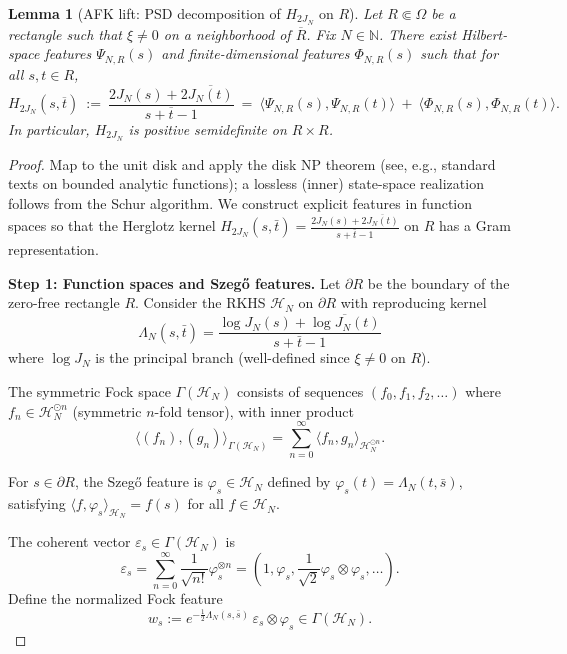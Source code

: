\documentclass[11pt]{article}
\newtheorem{lemma}[theorem]{Lemma}
\theoremstyle{definition}
\theoremstyle{remark}
\begin{document}
\begin{lemma}[AFK lift: PSD decomposition of \(H_{2J_N}\) on \(R\)]\label{lem:AFK}
Let \(R\Subset\Omega\) be a rectangle such that \(\xi\neq 0\) on a neighborhood of \(\overline R\). Fix \(N\in\mathbb N\). There exist Hilbert-space features \(\Psi_{N,R}(s)\) and finite-dimensional features \(\Phi_{N,R}(s)\) such that for all \(s,t\in R\),
\[
 H_{2J_N}(s,\overline t)\ :=\ \frac{2J_N(s)+2\overline{J_N(t)}}{s+\overline t-1}\ =\ \big\langle\Psi_{N,R}(s),\Psi_{N,R}(t)\big\rangle\ +\ \big\langle\Phi_{N,R}(s),\Phi_{N,R}(t)\big\rangle.
\]
In particular, \(H_{2J_N}\) is positive semidefinite on \(R\times R\).
\end{lemma}
\begin{proof}
Map to the unit disk and apply the disk NP theorem (see, e.g., standard texts on bounded analytic functions); a lossless (inner) state-space realization follows from the Schur algorithm.
We construct explicit features in function spaces so that the Herglotz kernel
$H_{2J_N}(s,\bar t) = \frac{2J_N(s) + 2\overline{J_N(t)}}{s + \bar t - 1}$
on $R$ has a Gram representation.

\medskip
\noindent\textbf{Step 1: Function spaces and Szegő features.}
Let $\partial R$ be the boundary of the zero-free rectangle $R$. Consider the RKHS $\mathcal{H}_N$ on $\partial R$ with reproducing kernel
\[
  \Lambda_N(s,\bar t) = \frac{\log J_N(s) + \overline{\log J_N(t)}}{s + \bar t - 1}
\]
where $\log J_N$ is the principal branch (well-defined since $\xi \neq 0$ on $R$).

The symmetric Fock space $\Gamma(\mathcal{H}_N)$ consists of sequences $(f_0, f_1, f_2, \ldots)$ where $f_n \in \mathcal{H}_N^{\odot n}$ (symmetric $n$-fold tensor), with inner product
\[
  \langle (f_n), (g_n) \rangle_{\Gamma(\mathcal{H}_N)} = \sum_{n=0}^\infty \langle f_n, g_n \rangle_{\mathcal{H}_N^{\odot n}}.
\]

For $s \in \partial R$, the Szegő feature is $\varphi_s \in \mathcal{H}_N$ defined by $\varphi_s(t) = \Lambda_N(t,\bar s)$, satisfying $\langle f, \varphi_s \rangle_{\mathcal{H}_N} = f(s)$ for all $f \in \mathcal{H}_N$.

The coherent vector $\varepsilon_s \in \Gamma(\mathcal{H}_N)$ is
\[
  \varepsilon_s = \sum_{n=0}^\infty \frac{1}{\sqrt{n!}} \varphi_s^{\otimes n} = (1, \varphi_s, \frac{1}{\sqrt{2}} \varphi_s \otimes \varphi_s, \ldots).
\]
Define the normalized Fock feature
\[
  w_s := e^{-\frac{1}{2}\Lambda_N(s,\bar s)} \, \varepsilon_s \otimes \varphi_s \in \Gamma(\mathcal{H}_N).
\]


\end{proof}
\end{document}
